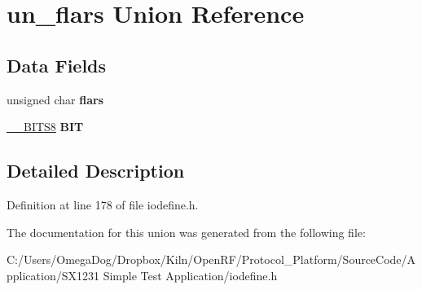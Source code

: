 \hypertarget{unionun__flars}{\section{un\-\_\-flars Union Reference}
\label{unionun__flars}
}
\subsection*{Data Fields}
\begin{DoxyCompactItemize}
\item 
\hypertarget{unionun__flars_a86e8cefa4db40c3f1890fae0292e0ede}{unsigned char {\bfseries flars}}\label{unionun__flars_a86e8cefa4db40c3f1890fae0292e0ede}

\item 
\hypertarget{unionun__flars_a50a9e8dd4dc9692def862336a9f21639}{\hyperlink{struct_____b_i_t_s8}{\-\_\-\-\_\-\-B\-I\-T\-S8} {\bfseries B\-I\-T}}\label{unionun__flars_a50a9e8dd4dc9692def862336a9f21639}

\end{DoxyCompactItemize}


\subsection{Detailed Description}


Definition at line 178 of file iodefine.\-h.



The documentation for this union was generated from the following file\-:\begin{DoxyCompactItemize}
\item 
C\-:/\-Users/\-Omega\-Dog/\-Dropbox/\-Kiln/\-Open\-R\-F/\-Protocol\-\_\-\-Platform/\-Source\-Code/\-Application/\-S\-X1231 Simple Test Application/iodefine.\-h\end{DoxyCompactItemize}
